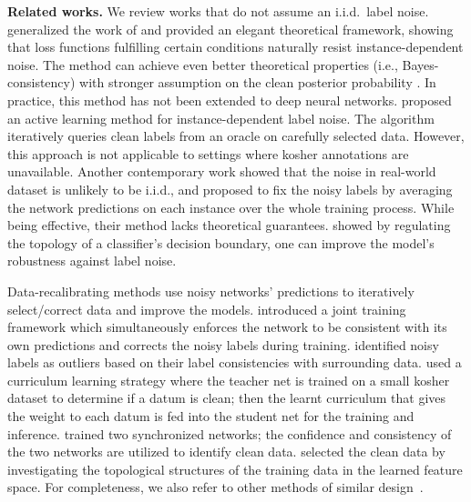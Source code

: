 \documentclass{article} \usepackage{iclr2021_conference,times}
\newcommand{\myparagraph}[1]{\textbf{#1}}
\begin{document}
\myparagraph{Related works.}
We review works that do not assume an i.i.d.~label noise. 
\cite{Aditya_Binary_Instance_2018_MachLearn} generalized the work of \citep{Ghosh_riskmini_2015_NIPS} and provided an elegant theoretical framework, showing that loss functions fulfilling certain conditions naturally resist instance-dependent noise. The method can achieve even better theoretical properties (i.e., Bayes-consistency) with stronger assumption on the clean posterior probability .
In practice, this method has not been extended to deep neural networks.
\cite{jiacheng_BoundedInstance_2020_ICML} proposed an active learning method for instance-dependent label noise. The algorithm iteratively queries clean labels from an oracle on carefully selected data. However, this approach is not applicable to settings where kosher annotations are unavailable.
Another contemporary work \citep{chen2020beyond} showed that the noise in real-world dataset is unlikely to be i.i.d., and proposed to fix the noisy labels by averaging the network predictions on each instance over the whole training process. While being effective, their method lacks theoretical guarantees.
\cite{chen2019topological} showed by regulating the topology of a classifier's decision boundary, one can improve the model's robustness against label noise. 

Data-recalibrating methods use noisy networks' predictions to iteratively select/correct data and improve the models.
\cite{tanaka2018joint} introduced a joint training framework which simultaneously enforces the network to be consistent with its own predictions and corrects the noisy labels during training. \cite{Wang_open_set_CVPR2018} identified noisy labels as outliers based on their label consistencies with surrounding data. \cite{Jiang_MentorNet_ICML18} used a curriculum learning strategy where the teacher net is trained on a small kosher dataset to determine if a datum is clean; then the learnt curriculum that gives the weight to each datum is fed into the student net for the training and inference. \citep{yu_coteachingplus_2019_ICML,Han_Co-Teaching_NIPS2018} trained two synchronized networks; the confidence and consistency of the two networks are utilized to identify clean data. \cite{wu2020topological} selected the clean data by investigating the topological structures of the training data in the learned feature space.
For completeness, we also refer to other methods of similar design~\citep{li_distillation_ICCV2017, vahdat2017toward, Veit_LearnNoise_CVPR2017, Ma_dim_driven_ICML18, abstention, dynamic_bootstrap_2019_icml,  Meta-Weight-Net_nips2019,  pencil_cvpr2019}. 
\end{document}
